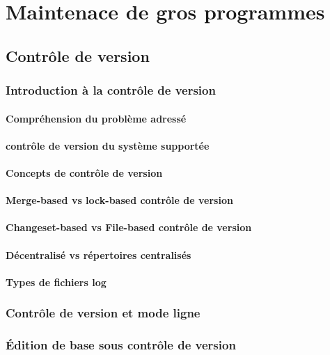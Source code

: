 \chapter{Maintenace de gros programmes}\label{chap25}
\section{Contrôle de version}\label{chap25sec1}
\subsection{Introduction à la contrôle de version}\label{chap25sec1subsec1}
\subsubsection{Compréhension du problème adressé}
\subsubsection{contrôle de version du système supportée}
\subsubsection{Concepts de contrôle de version}
\subsubsection{Merge-based vs lock-based contrôle de version}
\subsubsection{Changeset-based vs File-based contrôle de version}
\subsubsection{Décentralisé vs répertoires centralisés}
\subsubsection{Types de fichiers log}
\subsection{Contrôle de version et mode ligne}\label{chap25sec1subsec2}
\subsection{\'Edition de base sous contrôle de version}\label{chap25sec1subsec3}
